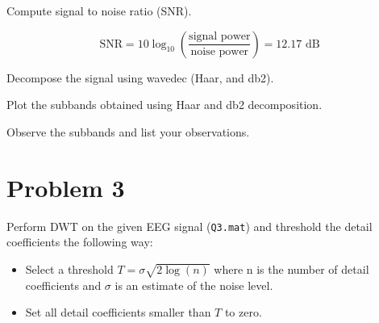 \vspace{0.5cm}

\begin{tcolorbox}[colback=green!5!white,colframe=green!75!black,title=Problem 2.a]
    Compute signal to noise ratio (SNR).
\end{tcolorbox}


\begin{equation}
    \text{SNR} = 10 \log_{10} \left( \frac{\text{signal power}}{\text{noise power}} \right) = 12.17 \text{ dB}
\end{equation}



\begin{tcolorbox}[colback=green!5!white,colframe=green!75!black,title=Problem 2.b]
    Decompose the signal using wavedec (Haar, and db2).
\end{tcolorbox}



\begin{tcolorbox}[colback=green!5!white,colframe=green!75!black,title=Problem 2.c]
    Plot the subbands obtained using Haar and db2 decomposition.
\end{tcolorbox}

\begin{tcolorbox}[colback=green!5!white,colframe=green!75!black,title=Problem 2.d]
    Observe the subbands and list your observations.
\end{tcolorbox}




\section*{Problem 3} \label{sec:problem3}

\begin{tcolorbox}[colback=blue!5!white,boxrule=0pt,frame empty]
    Perform DWT on the given EEG signal (\verb|Q3.mat|) and threshold the detail coefficients
    the following way:
    \vspace{0.5em}
    \begin{itemize}
        \item Select a threshold $T = \sigma \sqrt{2 \log(n)}$ where n is the number of detail coefficients 
        and $\sigma$ is an estimate of the noise level.
        \item Set all detail coefficients smaller than $T$ to zero.
    \end{itemize}
\end{tcolorbox}


